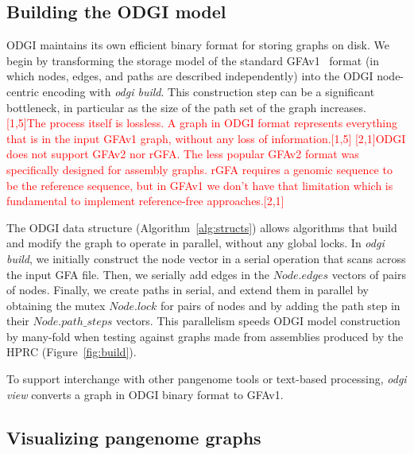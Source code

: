 \documentclass{bioinfo}
\newcommand{\REVIEWED}[1]{{\textcolor{Red}{#1}}}
\begin{document}
\subsection{Building the \textsc{ODGI} model}
\label{sec:build}
ODGI maintains its own efficient binary format for storing graphs on disk.
We begin by transforming the storage model of the standard GFAv1~\citep{GFA} format (in which nodes, edges, and paths are described independently) into the ODGI node-centric encoding with \textit{odgi build}.
This construction step can be a significant bottleneck, in particular as the size of the path set of the graph increases. \REVIEWED{[1,5]The process itself is lossless. A graph in ODGI format represents everything that is in the input GFAv1 graph, without any loss of information.[1,5]} \REVIEWED{[2,1]ODGI does not support GFAv2 nor rGFA. The less popular GFAv2 format was specifically designed for assembly graphs. rGFA requires a genomic sequence to be the reference sequence, but in GFAv1 we don't have that limitation which is fundamental to implement reference-free approaches.[2,1]}

The ODGI data structure (Algorithm~\ref{alg:structs}) allows algorithms that build and modify the graph to operate in parallel, without any global locks.
In \textit{odgi build}, we initially construct the node vector in a serial operation that scans across the input GFA file.
Then, we serially add edges in the $Node.edges$ vectors of pairs of nodes.
Finally, we create paths in serial, and extend them in parallel by obtaining the mutex $Node.lock$ for pairs of nodes and by adding the path step in their $Node.path\_steps$ vectors.
This parallelism speeds ODGI model construction by many-fold when testing against graphs made from assemblies produced by the HPRC (Figure~\ref{fig:build}).

To support interchange with other pangenome tools or text-based processing, \textit{odgi view} converts a graph in ODGI binary format to GFAv1.



\subsection{Visualizing pangenome graphs}
\label{sec:viz}

\end{document}
